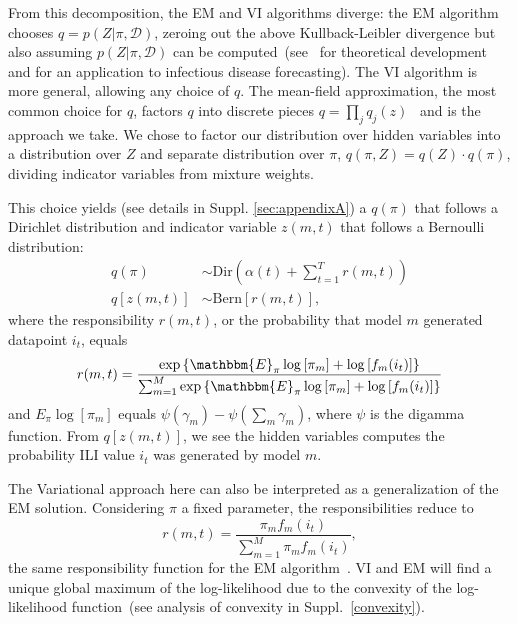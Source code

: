 \documentclass[12pt]{article}
\def\l{\left}
\def\r{\right}
\begin{document}

From this decomposition, the EM and VI algorithms diverge: the EM algorithm chooses $q = p(Z|\pi,\mathcal{D})$, zeroing out the above Kullback-Leibler divergence but also assuming $p(Z | \pi, \mathcal{D})$ can be computed~(see~\cite{bishop2006pattern} for theoretical development and \cite{reich2019collaborativepnas} for an application to infectious disease forecasting).
The VI algorithm is more general, allowing any choice of $q$.
The mean-field approximation, the most common choice for $q$, factors $q$ into discrete pieces $q = \prod_{j}q_{j}(z)$~\cite{blei2017variational,rustagi1976variational} and is the approach we take.
We chose to factor our distribution over hidden variables into a distribution over $Z$ and separate distribution over $\pi$, $q(\pi,Z) = q(Z) \cdot q(\pi)$, dividing indicator variables from mixture weights.

This choice yields (see details in Suppl. \ref{sec:appendixA}) a $q(\pi)$ that follows a Dirichlet distribution and indicator variable $z(m,t)$ that follows a Bernoulli distribution:
\begin{align}
    q(\pi)  &\sim \mathrm{Dir}\l( \alpha(t) + \sum_{t=1}^{T}  r(m,t)  \r) \label{dirSol}\\
   q\l[z(m,t)\r] &\sim \mathrm{Bern}\l[ r(m,t) \r],
\end{align}
where the responsibility $r(m,t)$, or the probability that model $m$ generated datapoint $i_{t}$, equals
\begin{equation}
  r(m,t) = \dfrac{ \exp \l \{ \mathbbm{E}_{\pi} \log \l[ \pi_m \r] + \log \l[ f_{m}(i_{t}) \r] \r \} } {\sum_{m=1}^{M} \exp \l \{ \mathbbm{E}_{\pi} \log \l[ \pi_m \r] + \log \l[ f_{m}(i_{t}) \r] \r \}}
\end{equation}
and $E_{\pi}\log[\pi_m]$ equals $\psi(\gamma_{m}) - \psi\l(\sum_{m} \gamma_{m} \r)$, where $\psi$ is the digamma function.
From $q\l[z(m,t)\r]$, we see the hidden variables computes the probability ILI value $i_{t}$ was generated by model $m$.

The Variational approach here can also be interpreted as a generalization of the EM solution.
Considering $\pi$ a fixed parameter, the responsibilities reduce to
\begin{equation}
  r(m,t) = \dfrac{\pi_mf_{m}(i_{t})}{\sum_{m=1}^{M} \pi_mf_{m}(i_{t}) },
\end{equation}
the same responsibility function for the EM algorithm~\cite{reich2019collaborativepnas}.
VI and EM will find a unique global maximum of the log-likelihood due to the convexity of the log-likelihood function~(see analysis of convexity in Suppl.~\ref{convexity}).
\end{document}
